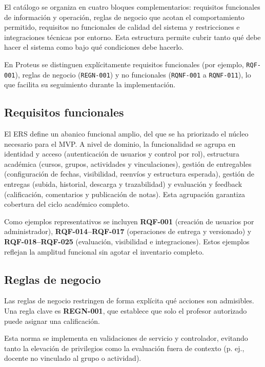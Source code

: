 El cat\'alogo se organiza en cuatro bloques complementarios: requisitos funcionales de informaci\'on y operaci\'on, reglas de negocio que acotan el comportamiento permitido, requisitos no funcionales de calidad del sistema y restricciones e integraciones t\'ecnicas por entorno. Esta estructura permite cubrir tanto qu\'e debe hacer el sistema como bajo qu\'e condiciones debe hacerlo.

En Proteus \cite{proteus} se distinguen expl\'icitamente requisitos funcionales (por ejemplo,
\texttt{RQF-001}), reglas de negocio (\texttt{REGN-001}) y no funcionales
(\texttt{RQNF-001} a \texttt{RQNF-011}), lo que facilita su seguimiento
durante la implementaci\'on.

\subsection{Requisitos funcionales}

El ERS define un abanico funcional amplio, del que se ha priorizado el n\'ucleo
necesario para el MVP. A nivel de dominio, la funcionalidad se agrupa en identidad y acceso (autenticaci\'on de usuarios y control por rol), estructura acad\'emica (cursos, grupos, actividades y vinculaciones), gesti\'on de entregables (configuraci\'on de fechas, visibilidad, reenv\'ios y estructura esperada), gesti\'on de entregas (subida, historial, descarga y trazabilidad) y evaluaci\'on y feedback (calificaci\'on, comentarios y publicaci\'on de notas). Esta agrupaci\'on garantiza cobertura del ciclo acad\'emico completo.

Como ejemplos representativos se incluyen \textbf{RQF-001} (creaci\'on de usuarios por administrador), \textbf{RQF-014--RQF-017} (operaciones de entrega y versionado) y \textbf{RQF-018--RQF-025} (evaluaci\'on, visibilidad e integraciones). Estos ejemplos reflejan la amplitud funcional sin agotar el inventario completo.

\subsection{Reglas de negocio}

Las reglas de negocio restringen de forma expl\'icita qu\'e acciones son admisibles.
Una regla clave es \textbf{REGN-001}, que establece que solo el profesor
autorizado puede asignar una calificaci\'on.

Esta norma se implementa en validaciones de servicio y controlador,
evitando tanto la elevaci\'on de privilegios como la evaluaci\'on fuera de contexto
(p. ej., docente no vinculado al grupo o actividad).


